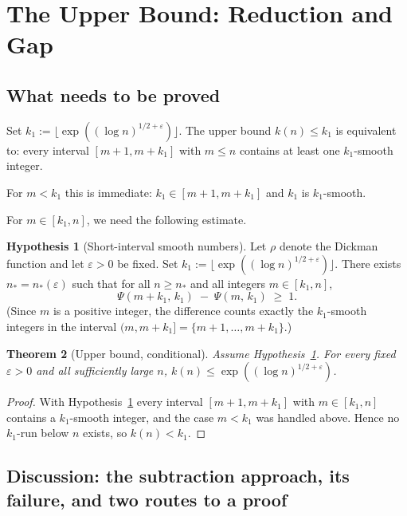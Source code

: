 \documentclass[12pt]{article}
\newtheorem{theorem}{Theorem}
\theoremstyle{definition}
\newtheorem{hyp}[theorem]{Hypothesis}
\begin{document}
\section{The Upper Bound: Reduction and Gap}

\subsection*{What needs to be proved}

Set $k_1 := \lfloor\exp((\log n)^{1/2+\varepsilon})\rfloor$.
The upper bound $k(n) \leq k_1$ is equivalent to: every interval $[m+1, m+k_1]$
with $m \leq n$ contains at least one $k_1$-smooth integer.

For $m < k_1$ this is immediate: $k_1 \in [m+1, m+k_1]$ and $k_1$ is $k_1$-smooth.

For $m \in [k_1, n]$, we need the following estimate.

\begin{hyp}[Short-interval smooth numbers]\label{hyp:SI}
Let $\rho$ denote the Dickman function and let $\varepsilon > 0$ be fixed.
Set $k_1 := \lfloor\exp((\log n)^{1/2+\varepsilon})\rfloor$.
There exists $n_* = n_*(\varepsilon)$ such that for all $n \geq n_*$
and all integers $m \in [k_1, n]$,
\begin{equation}\label{eq:SI}
  \Psi(m + k_1,\, k_1) \;-\; \Psi(m,\, k_1) \;\geq\; 1.
\end{equation}
(Since $m$ is a positive integer, the difference counts exactly the $k_1$-smooth
integers in the interval $(m, m+k_1] = \{m+1,\ldots,m+k_1\}$.)
\end{hyp}

\begin{theorem}[Upper bound, conditional]\label{thm:upper}
Assume Hypothesis~\ref{hyp:SI}.
For every fixed $\varepsilon > 0$ and all sufficiently large $n$,
$k(n) \leq \exp((\log n)^{1/2+\varepsilon})$.
\end{theorem}

\begin{proof}
With Hypothesis~\ref{hyp:SI} every interval $[m+1, m+k_1]$ with $m \in [k_1,n]$
contains a $k_1$-smooth integer, and the case $m < k_1$ was handled above.
Hence no $k_1$-run below $n$ exists, so $k(n) < k_1$.
\end{proof}

\subsection*{Discussion: the subtraction approach, its failure, and two routes to a proof}
\end{document}
